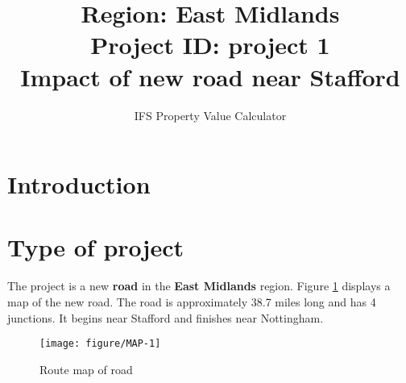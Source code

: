 \documentclass{article}\usepackage[]{graphicx}\usepackage[]{color}
\title{Region:   East Midlands \\
       Project ID:   project 1 \\
       Impact of new road near Stafford }
\author{IFS Property Value Calculator}
\date{}
\newenvironment{knitrout}{}{} %
\begin{document}
\maketitle

\section{Introduction}

\section{Type of project}
The project is a new \textbf{road} in the 
\textbf{East Midlands} region. Figure \ref{fig:MAP} displays a map of the new road. The road is approximately 38.7 miles long and has 4 junctions. It begins near Stafford and finishes near Nottingham.

\begin{knitrout}\scriptsize
{}\color{fgcolor}\begin{figure}[H]

{\centering \texttt{[image: figure/MAP-1]} 

}

\caption[Route map of road]{Route map of road}\label{fig:MAP}
\end{figure}


\end{knitrout}
\end{document}

